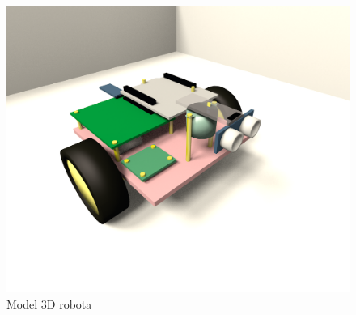 \documentclass[a4paper]{article}
\begin{document}
\begin{figure}[p]
\centering
\includegraphics[width=0.8\linewidth]{robot2.png}
\caption{Model 3D robota}
\label{m3D3}
\end{figure}
\end{document}
